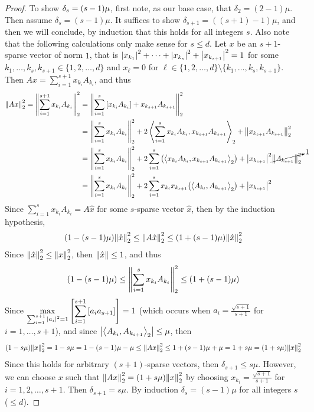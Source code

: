 \documentclass{article} %
\theoremstyle{plain}
\newcommand{\VEC}[2]{\left\langle #1, #2 \right\rangle}
\numberwithin{equation}{section} %
\numberwithin{figure}{section} %
\numberwithin{table}{section} %
\begin{document}
\begin{proof}
    To show $\delta_s = \qty(s - 1)\mu$, first note, as our base case, that $\delta_2 = (2 - 1)\mu$.  Then assume $\delta_s = (s - 1)\mu$.  It suffices to show $\delta_{s+1} = ((s + 1) - 1)\mu$, and then we will conclude, by induction that this holds for all integers $s$.  Also note that the following calculations only make sense for $s \leq d$.  Let $x$ be an $s+1$-sparse vector of norm $1$, that is $\abs{x_{k_1}}^2 + \dots + \abs{x_{k_s}}^2 + \abs{x_{k_{s+1}}}^2 = 1$ for some $k_1, \dots, k_s, k_{s+1} \in \{1, 2, \dots, d\}$ and $x_\ell = 0$ for $\ell \in \{1, 2, \dots, d\}\setminus \{k_1, \dots, k_s, k_{s+1}\}$.  Then $Ax = \displaystyle\sum_{i=1}^{s+1} x_{k_i}A_{k_i}$, and thus
    \begin{align*}
        \norm{Ax}_2^2 = \norm{\sum_{i=1}^{s+1} x_{k_i}A_{k_i}}_2^2 &= \norm{\sum_{i=1}^{s} \qty[x_{k_i}A_{k_i}] + x_{k_{s+1}}A_{k_{s+1}}}_2^2 \\
        &= \norm{\sum_{i=1}^{s} x_{k_i}A_{k_i}}_2^2 + 2\VEC{\sum_{i=1}^{s} x_{k_i}A_{k_i}}{x_{k_{s+1}}A_{k_{s+1}}}_2 + \norm{x_{k_{s+1}}A_{k_{s+1}}}_2^2 \\
        &= \norm{\sum_{i=1}^{s} x_{k_i}A_{k_i}}_2^2 + 2\sum_{i=1}^s\qty(\VEC{x_{k_i}A_{k_i}}{x_{k_{s+1}}A_{k_{s+1}}}_2) + \abs{x_{k_{s+1}}}^2\cancelto{1}{\norm{A_{k_{s+1}}}_2^2} \\
        &= \norm{\sum_{i=1}^{s} x_{k_i}A_{k_i}}_2^2 + 2\sum_{i=1}^s x_{k_i}x_{k_{s+1}}\qty(\VEC{A_{k_i}}{A_{k_{s+1}}}_2) + \abs{x_{k_{s+1}}}^2
    \end{align*}
    Since $\sum_{i=1}^{s} x_{k_i}A_{k_i} = A\hat{x}$ for some $s$-sparse vector $\hat{x}$, then by the induction hypothesis,
    \begin{align*}
        \qty(1 - (s - 1)\mu)\norm{\hat{x}}_2^2 \leq \norm{A\hat{x}}_2^2 \leq \qty(1 + (s - 1)\mu)\norm{\hat{x}}_2^2
    \end{align*}
    Since $\norm{\hat{x}}_2^2 \leq \norm{x}_2^2$, then $\norm{\hat{x}} \leq 1$, and thus
    \begin{align*}
        \qty(1 - (s - 1)\mu) \leq \norm{\sum_{i=1}^s x_{k_i}A_{k_i}}_2^2 \leq \qty(1 + (s - 1)\mu)
    \end{align*}
    Since $\displaystyle\max_{\sum_{i=1}^{s+1}\abs{a_i}^2 = 1}\qty[\sum_{i=1}^{s+1} \qty[a_i a_{s+1}]] = 1$ (which occurs when $a_i = \frac{\sqrt{s+1}}{s+1}$ for $i = 1, \dots, s+1$), and since $\abs{\VEC{A_{k_i}}{A_{k_{s+1}}}_2} \leq \mu$, then
    \begin{align*}
        \qty(1 - s\mu)\norm{x}_2^2 = 1 - s\mu = 1 - (s - 1)\mu - \mu \leq \norm{Ax}_2^2 \leq 1 + (s-1)\mu + \mu = 1 + s\mu = \qty(1 + s\mu)\norm{x}_2^2
    \end{align*}
    Since this holds for arbitrary $(s+1)$-sparse vectors, then $\delta_{s+1} \leq s\mu$.  However, we can choose $x$ such that $\norm{Ax}_2^2 = \qty(1 + s\mu)\norm{x}_2^2$ by choosing $x_{k_i} = \frac{\sqrt{s+1}}{s+1}$ for $i = 1, 2, \dots, s+1$.  Then $\delta_{s+1} = s\mu$.  By induction $\delta_s = (s - 1)\mu$ for all integers $s$ ($\leq d$).
\end{proof}
\end{document}
